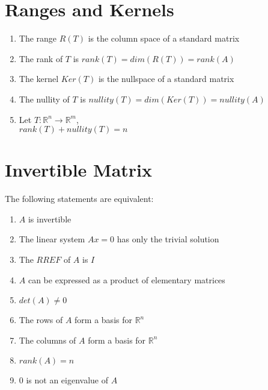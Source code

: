 \documentclass{article}
\begin{document}
\section*{Ranges and Kernels}
\begin{enumerate}
    \item The range $R(T)$ is the column space of a standard matrix
    \item The rank of $T$ is $rank(T) = dim(R(T)) = rank(A)$
    \item The kernel $Ker(T)$ is the nullspace of a standard matrix
    \item The nullity of $T$ is $nullity(T) = dim(Ker(T)) = nullity(A)$
    \item Let $T: \mathbb{R}^n \rightarrow \mathbb{R}^m$, \\
    $rank(T) + nullity(T) = n$
\end{enumerate}

\section*{Invertible Matrix}
The following statements are equivalent:
\begin{enumerate}
    \item $A$ is invertible
    \item The linear system $Ax = 0$ has only the trivial solution
    \item The $RREF$ of $A$ is $I$
    \item $A$ can be expressed as a product of elementary matrices
    \item $det(A) \neq 0$
    \item The rows of $A$ form a basis for $\mathbb{R}^n$
    \item The columns of $A$ form a basis for $\mathbb{R}^n$
    \item $rank(A) = n$
    \item $0$ is not an eigenvalue of $A$
\end{enumerate}
\end{document}
